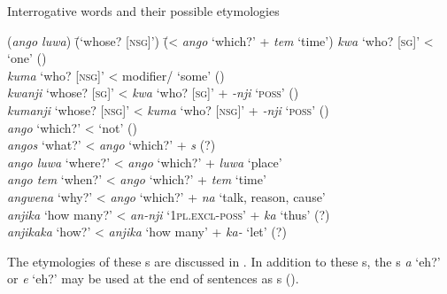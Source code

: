 \ea%
    \label{ex:otherwc:148}
          Interrogative words and their possible etymologies
          \begin{tabbing}
{(\textit{ango luwa})} \= {(‘whose? [\textsc{nsg}]’)}  \=    {(< \textit{ango} ‘which?’ + \textit{tem} ‘time’)}\kill
    \textit{kwa}  \>  ‘who? [\textsc{sg}]’ \>   <  ‘one’ ()\\
    \textit{kuma} \>   ‘who? [\textsc{nsg}]’ \>   < modifier/ ‘some’ ()\\
    \textit{kwanji} \>   ‘whose? [\textsc{sg}]’ \>   < \textit{kwa} ‘who? [\textsc{sg}]’ + \textit{-nji} ‘\textsc{poss}’ ()\\
    \textit{kumanji} \> ‘whose? [\textsc{nsg}]’ \> < \textit{kuma} ‘who? [\textsc{nsg}]’ + \textit{-nji} ‘\textsc{poss}’ ()\\
    \textit{ango}  \>  ‘which?’ \>     <  ‘not’ ()\\
    \textit{angos} \>   ‘what?’ \>     < \textit{ango} ‘which?’ + \textit{s} (?)\footnotemark{}\\
    \textit{ango luwa} \> ‘where?’  \>    < \textit{ango} ‘which?’ + \textit{luwa} ‘place’\\
    \textit{ango tem} \> ‘when?’  \>    < \textit{ango} ‘which?’ + \textit{tem} ‘time’\footnotemark{}\\
    \textit{angwena} \> ‘why?’  \>      < \textit{ango} ‘which?’ + \textit{na} ‘talk, reason, cause’\\
    \textit{anjika} \>   ‘how many?’ \>   < \textit{an-nji} ‘1\textsc{pl.excl-poss’} + \textit{ka} ‘thus’ (?)\\
    \textit{anjikaka} \> ‘how?’   \>     < \textit{anjika} ‘how many’ + \textit{ka-} ‘let’ (?)
    \end{tabbing}
    \z
{}

The etymologies of these s are discussed in . In addition to these s, the s \textit{a} ‘eh?’ or \textit{e} ‘eh?’ may be used at the end of  sentences as s ().


